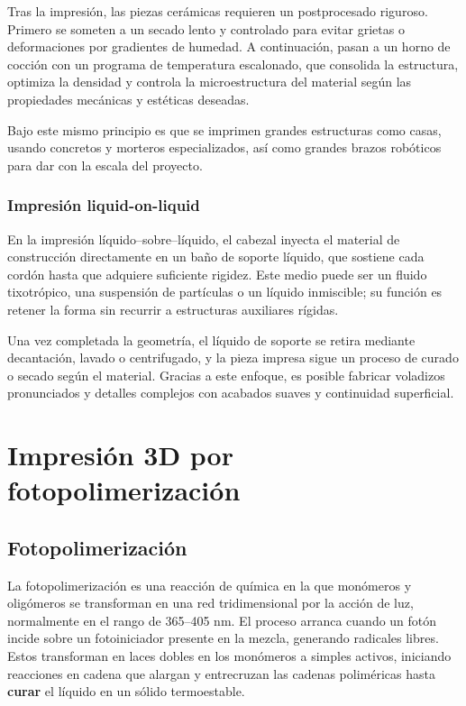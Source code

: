 Tras la impresión, las piezas cerámicas requieren un postprocesado riguroso. Primero se someten a un secado lento y controlado para evitar grietas o deformaciones por gradientes de humedad. A continuación, pasan a un horno de cocción con un programa de temperatura escalonado, que consolida la estructura, optimiza la densidad y controla la microestructura del material según las propiedades mecánicas y estéticas deseadas.

Bajo este mismo principio es que se imprimen grandes estructuras como casas, usando concretos y morteros especializados, así como grandes brazos robóticos para dar con la escala del proyecto.

\subsubsection{Impresión liquid-on-liquid}

En la impresión líquido–sobre–líquido, el cabezal inyecta el material de construcción directamente en un baño de soporte líquido, que sostiene cada cordón hasta que adquiere suficiente rigidez. Este medio puede ser un fluido tixotrópico, una suspensión de partículas o un líquido inmiscible; su función es retener la forma sin recurrir a estructuras auxiliares rígidas.

Una vez completada la geometría, el líquido de soporte se retira mediante decantación, lavado o centrifugado, y la pieza impresa sigue un proceso de curado o secado según el material. Gracias a este enfoque, es posible fabricar voladizos pronunciados y detalles complejos con acabados suaves y continuidad superficial.

 
\section{Impresión 3D por fotopolimerización}

\subsection{Fotopolimerización}

La fotopolimerización es una reacción de química en la que monómeros y oligómeros se transforman en una red tridimensional por la acción de luz, normalmente en el rango de 365–405 nm. El proceso arranca cuando un fotón incide sobre un fotoiniciador presente en la mezcla, generando radicales libres. Estos transforman en laces dobles en los monómeros a simples activos, iniciando reacciones en cadena que alargan y entrecruzan las cadenas poliméricas hasta \textbf{curar} el líquido en un sólido termoestable.

